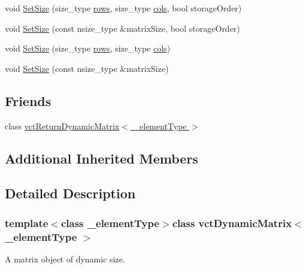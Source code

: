 {\bf }\par
\begin{DoxyCompactItemize}
\item 
void \hyperlink{classvct_dynamic_matrix_a4ff773e41fa6605e6e2527822b1ae662}{Set\-Size} (size\-\_\-type \hyperlink{classvct_dynamic_const_matrix_base_a5eac13be2207ebeb8766cde379d73438}{rows}, size\-\_\-type \hyperlink{classvct_dynamic_const_matrix_base_aa6c51d41a100da49a7e7ac7edb20ecd9}{cols}, bool storage\-Order)
\item 
void \hyperlink{classvct_dynamic_matrix_a909f2ba6b179b8598897a65a4bb5f369}{Set\-Size} (const nsize\-\_\-type \&matrix\-Size, bool storage\-Order)
\item 
void \hyperlink{classvct_dynamic_matrix_a080da305b92644732f33a9b964ef1ae1}{Set\-Size} (size\-\_\-type \hyperlink{classvct_dynamic_const_matrix_base_a5eac13be2207ebeb8766cde379d73438}{rows}, size\-\_\-type \hyperlink{classvct_dynamic_const_matrix_base_aa6c51d41a100da49a7e7ac7edb20ecd9}{cols})
\item 
void \hyperlink{classvct_dynamic_matrix_a9ab88fbeda43ed51e06e871006f255fd}{Set\-Size} (const nsize\-\_\-type \&matrix\-Size)
\end{DoxyCompactItemize}

\subsection*{Friends}
\begin{DoxyCompactItemize}
\item 
class \hyperlink{classvct_dynamic_matrix_a15520a0716ed8e67f2cba2a95cbe51a7}{vct\-Return\-Dynamic\-Matrix$<$ \-\_\-element\-Type $>$}
\end{DoxyCompactItemize}
\subsection*{Additional Inherited Members}


\subsection{Detailed Description}
\subsubsection*{template$<$class \-\_\-element\-Type$>$class vct\-Dynamic\-Matrix$<$ \-\_\-element\-Type $>$}

A matrix object of dynamic size. 

